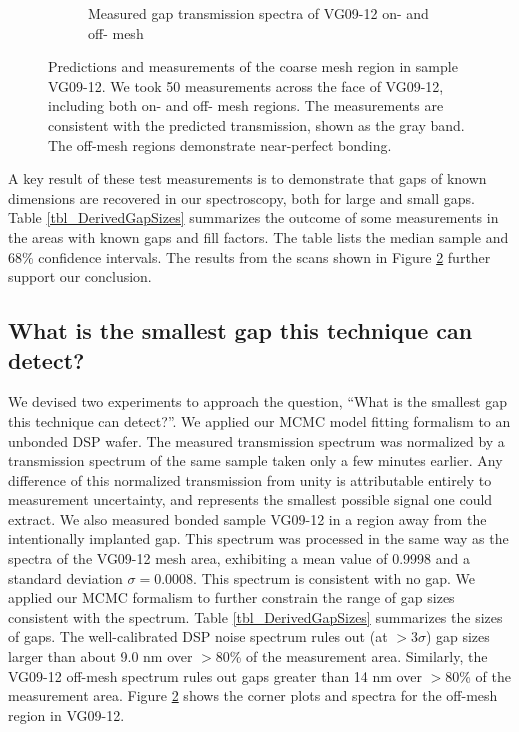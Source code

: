 \begin{figure}[htbp]
\begin{subfigure}[b]{0.65\textwidth}
        \caption{Measured gap transmission spectra of VG09-12 on- and off- mesh \label{figVG0912}}
    \end{subfigure}
\caption{Predictions and measurements of the coarse mesh region in sample VG09-12.  We took 50 measurements across the face of VG09-12, including both on- and off- mesh regions.  The measurements are consistent with the predicted transmission, shown as the gray band.  The off-mesh regions demonstrate near-perfect bonding.\label{figVG12}}
\end{figure}

A key result of these test measurements is to demonstrate that gaps of known dimensions are recovered in our spectroscopy, both for large and small gaps.  Table \ref{tbl_DerivedGapSizes} summarizes the outcome of some measurements in the areas with known gaps and fill factors.  The table lists the median sample and 68\% confidence intervals.  The results from the scans shown in Figure \ref{figVG12} further support our conclusion.

\subsection{What is the smallest gap this technique can detect?}
We devised two experiments to approach the question, ``What is the smallest gap this technique can detect?''.  We applied our MCMC model fitting formalism to an unbonded DSP wafer.  The measured transmission spectrum was normalized by a transmission spectrum of the same sample taken only a few minutes earlier.  Any difference of this normalized transmission from unity is attributable entirely to measurement uncertainty, and represents the smallest possible signal one could extract.  We also measured bonded sample VG09-12 in a region away from the intentionally implanted gap.  This spectrum was processed in the same way as the spectra of the VG09-12 mesh area, exhibiting a mean value of 0.9998 and a standard deviation $\sigma=0.0008$.  This spectrum is consistent with no gap.  We applied our MCMC formalism to further constrain the range of gap sizes consistent with the spectrum.  Table \ref{tbl_DerivedGapSizes} summarizes the sizes of gaps.  The well-calibrated DSP noise spectrum rules out (at $>3\sigma$) gap sizes larger than about 9.0 nm over $>80$\% of the measurement area.  Similarly, the VG09-12 off-mesh spectrum rules out gaps greater than 14 nm over $>80$\% of the measurement area.  Figure \ref{figVG12} shows the corner plots and spectra for the off-mesh region in VG09-12.

